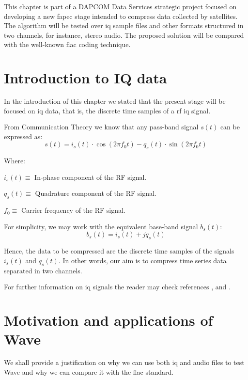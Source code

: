 This chapter is part of a DAPCOM Data Services strategic project focused on developing a new \acrshort{fapec} stage intended to compress data collected by satellites. The algorithm will be tested over \acrshort{iq} sample files and other formats structured in two channels, for instance, stereo audio. The proposed solution will be compared with the well-known \acrshort{flac} coding technique.

\section{Introduction to IQ data}

In the introduction of this chapter we stated that the present stage will be focused on \acrshort{iq} data, that is, the discrete time samples of a \acrshort{rf} \acrshort{iq} signal.

From Communication Theory we know that any pass-band signal $s(t)$ can be expressed as:
\begin{equation}
s(t) = i_s(t) \cdot \cos(2\pi f_0 t) - q_s(t) \cdot \sin(2\pi f_0 t)
\end{equation}

Where:
\begin{description}
	\item $i_s(t) \equiv$ In-phase component of the RF signal.
	\item $q_s(t) \equiv$ Quadrature component of the RF signal.
	\item $f_0 \equiv$ Carrier frequency of the RF signal.
\end{description}

For simplicity, we may work with the equivalent base-band signal $b_s(t)$:
\begin{equation}
	b_s(t) = i_s(t) + j q_s(t)
\end{equation}

Hence, the data to be compressed are the discrete time samples of the signals $i_s(t)$ and $q_s(t)$. In other words, our aim is to compress time series data separated in two channels.

For further information on \acrshort{iq} signals the reader may check references \parencite{IQintro}, \parencite{carlson2010communication} and \parencite{ICOM}.

\section{Motivation and applications of Wave} \label{sec:wave_motivation}
We shall provide a justification on why we can use both \acrshort{iq} and audio files to test Wave and why we can compare it with the \acrshort{flac} standard.

